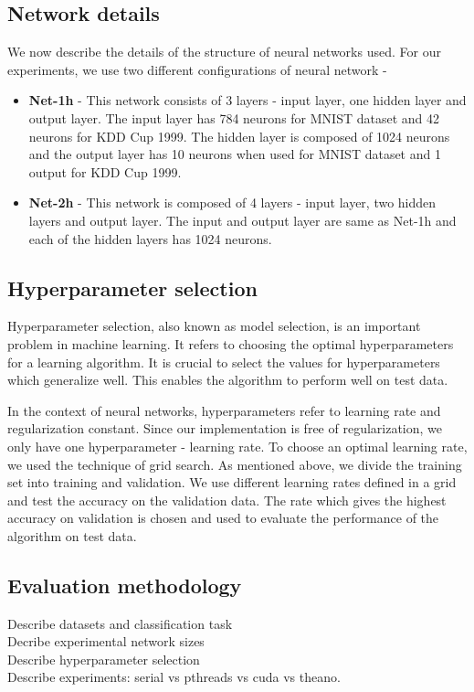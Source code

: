 \subsection{Network details}
We now describe the details of the structure of neural networks used. For our experiments, we use two different configurations of neural network - 
\begin{itemize}
\item \textbf{Net-1h} - This network consists of 3 layers - input layer, one hidden layer and output layer. The input layer has 784 neurons for MNIST dataset and 42 neurons for KDD Cup 1999. The hidden layer is composed of 1024 neurons and the output layer has 10 neurons when used for MNIST dataset and 1 output for KDD Cup 1999.
\item \textbf{Net-2h} - This network is composed of 4 layers - input layer, two hidden layers and output layer. The input and output layer are same as Net-1h and each of the hidden layers has 1024 neurons.
\end{itemize}

\subsection{Hyperparameter selection}
Hyperparameter selection, also known as model selection, is an important problem in machine learning. It refers to choosing the optimal hyperparameters for a learning algorithm. It is crucial to select the values for hyperparameters which generalize well. This enables the algorithm to perform well on test data.

In the context of neural networks, hyperparameters refer to learning rate and regularization constant. Since our implementation is free of regularization, we only have one hyperparameter - learning rate. To choose an optimal learning rate, we used the technique of grid search. As mentioned above, we divide the training set into training and validation. We use different learning rates defined in a grid and test the accuracy on the validation data. The rate which gives the highest accuracy on validation is chosen and used to evaluate the performance of the algorithm on test data.

\subsection{Evaluation methodology}

Describe datasets and classification task \\
Decribe experimental network sizes \\
Describe hyperparameter selection \\
Describe experiments: serial vs pthreads vs cuda vs theano.

